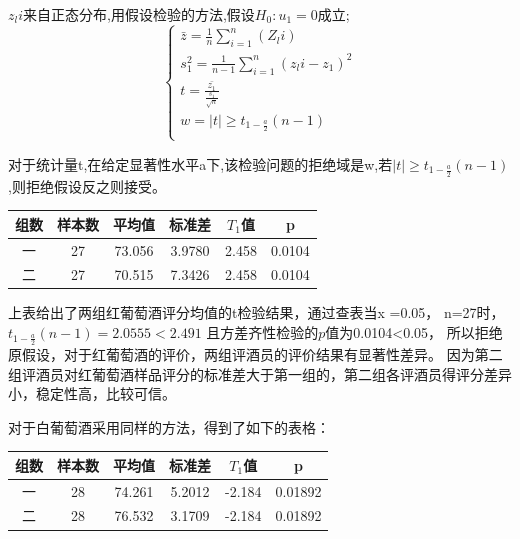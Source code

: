 \documentclass[UTF8]{ctexart}
\begin{document}
$z_li$来自正态分布,用假设检验的方法,假设$H_{0}:u_1=0$成立;
\[\left\{\begin{array}{llcl}

		\bar{z}=\frac{1}{n}\sum_{i=1}^n(Z_li)         \\

		s_{1}^2=\frac{1}{n-1}\sum_{i=1}^n(z_li-z_1)^2 \\

		t=\frac{\bar{z_1}}{\frac{s_1}{\sqrt{n}}}      \\

		w={\mid t \mid \ge t_{1-\frac{a}{2}}(n-1)}    \\

	\end{array} \right.\]

对于统计量t,在给定显著性水平a下,该检验问题的拒绝域是w,若${\mid t \mid \ge t_{1-\frac{a}{2}}(n-1)}$,则拒绝假设反之则接受。

\begin{center}
	\begin{tabular}{||c c c c c c||}
		\hline
		组数 & 样本数 & 平均值 & 标准差 & $T_1$值 & p      \\ [0.5ex]
		\hline
		一   & 27     & 73.056 & 3.9780 & 2.458   & 0.0104 \\
		\hline
		二   & 27     & 70.515 & 7.3426 & 2.458   & 0.0104 \\
		\hline
	\end{tabular}
\end{center}

上表给出了两组红葡萄酒评分均值的t检验结果，通过查表当x =0.05， n=27时， $t_{1-\frac{a}{2}}(n-1)=2.0555<2.491$
且方差齐性检验的$p$值为0.0104<0.05，
所以拒绝原假设，对于红葡萄酒的评价，两组评酒员的评价结果有显著性差异。
因为第二组评酒员对红葡萄酒样品评分的标准差大于第一组的，第二组各评酒员得评分差异小，稳定性高，比较可信。

对于白葡萄酒采用同样的方法，得到了如下的表格：
\begin{center}
	\begin{tabular}{||c c c c c c||}
		\hline
		组数 & 样本数 & 平均值 & 标准差 & $T_1$值 & p       \\ [0.5ex]
		\hline
		一   & 28     & 74.261 & 5.2012 & -2.184  & 0.01892 \\
		\hline
		二   & 28     & 76.532 & 3.1709 & -2.184  & 0.01892 \\
		\hline
	\end{tabular}
\end{center}
\end{document}
